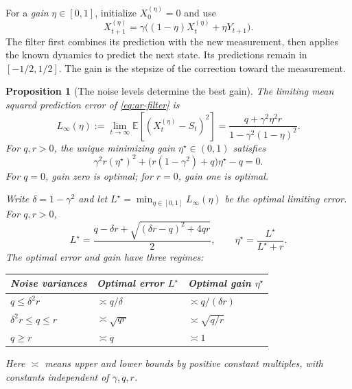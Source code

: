 \documentclass[11pt,twoside]{article}
\newcommand{\E}{\mathbb E}
\newtheorem{proposition}[theorem]{Proposition}
\theoremstyle{definition}
\theoremstyle{remark}
\begin{document}
For a \emph{gain} $\eta\in[0,1]$, initialize $X_0^{(\eta)}=0$ and use
\begin{equation}
 X_{t+1}^{(\eta)}
 =\gamma\bigl((1-\eta)X_t^{(\eta)}+\eta Y_{t+1}\bigr).
 \label{eq:ar-filter}
\end{equation}
The filter first combines its prediction with the new measurement, then
applies the known dynamics to predict the next state. Its predictions
remain in $[-1/2,1/2]$. The gain is the stepsize of the correction toward
the measurement.

\begin{proposition}[The noise levels determine the best gain]
\label{ex:ar-risk}
The limiting mean squared prediction error of \cref{eq:ar-filter} is
\begin{equation}
 L_\infty(\eta)
 :=\lim_{t\to\infty}\E[(X_t^{(\eta)}-S_t)^2]
 =\frac{q+\gamma^2\eta^2r}{1-\gamma^2(1-\eta)^2}.
 \label{eq:ar-risk}
\end{equation}
For $q,r>0$, the unique minimizing gain $\eta^\star\in(0,1)$ satisfies
\begin{equation}
 \gamma^2r(\eta^\star)^2+
 \bigl(r(1-\gamma^2)+q\bigr)\eta^\star-q=0.
 \label{eq:ar-optimal-gain}
\end{equation}
For $q=0$, gain zero is optimal; for $r=0$, gain one is optimal.

Write $\delta=1-\gamma^2$ and let
$L^\star=\min_{\eta\in[0,1]}L_\infty(\eta)$ be the optimal limiting error.
For $q,r>0$,
\begin{equation}
 L^\star=\frac{q-\delta r+\sqrt{(\delta r-q)^2+4qr}}2,
 \qquad \eta^\star=\frac{L^\star}{L^\star+r}.
 \label{eq:ar-optimal-error}
\end{equation}
The optimal error and gain have three regimes:
\begin{center}
\renewcommand{\arraystretch}{1.3}
\begin{tabular}{lll}
\toprule
Noise variances & Optimal error $L^\star$ & Optimal gain $\eta^\star$\\
\midrule
$q\le\delta^2r$ & $\asymp q/\delta$ & $\asymp q/(\delta r)$\\
$\delta^2r\le q\le r$ & $\asymp\sqrt{qr}$ & $\asymp\sqrt{q/r}$\\
$q\ge r$ & $\asymp q$ & $\asymp1$\\
\bottomrule
\end{tabular}
\end{center}
Here $\asymp$ means upper and lower bounds by positive constant multiples,
with constants independent of $\gamma,q,r$.
\end{proposition}
\end{document}
